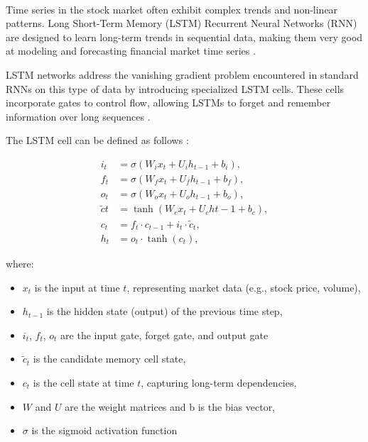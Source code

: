 \documentclass[12pt, letterpaper]{article}
\begin{document}
    \paragraph*{}
    

    Time series in the stock market often exhibit complex trends and non-linear patterns. 
    Long Short-Term Memory (LSTM) Recurrent Neural Networks (RNN) are designed to learn long-term trends in sequential data, making them very good at modeling and forecasting financial market time series \cite{hochreiter1997, greff2017}.

    LSTM networks address the vanishing gradient problem encountered in standard RNNs on this type of data by introducing specialized LSTM cells. These cells incorporate gates to control flow, allowing LSTMs to forget and remember information over long sequences \cite{hochreiter1997}.


    The LSTM cell can be defined as follows \cite{hochreiter1997}:

\begin{align*} 
    i_t &= \sigma(W_i x_t + U_i h_{t-1} + b_i), \\ f_t &= \sigma(W_f x_t + U_f h_{t-1} + b_f), \\ o_t &= \sigma(W_o x_t + U_o h_{t-1} + b_o), \\ \tilde{c}t &= \tanh(W_c x_t + U_c h{t-1} + b_c), \\ c_t &= f_t \cdot c_{t-1} + i_t \cdot \tilde{c}_t, \\ h_t &= o_t \cdot \tanh(c_t), 
\end{align*}

where:

\begin{itemize}
    \item $x_t$ is the input at time $t$, representing market data (e.g., stock price, volume),
    \item $h_{t-1}$ is the hidden state (output) of the previous time step,
    \item $i_t$, $f_t$, $o_t$ are the input gate, forget gate, and output gate
    \item $\tilde{c}_t$ is the candidate memory cell state,
    \item $c_t$ is the cell state at time $t$, capturing long-term dependencies,
    \item $W$ and $U$ are the weight matrices and b is the bias vector,
    \item $\sigma$ is the sigmoid activation function
\end{itemize}
\end{document}
